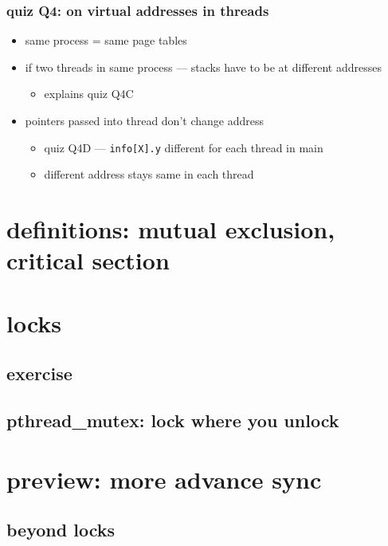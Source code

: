 \begin{frame}
\frametitle{quiz Q4: on virtual addresses in threads}
\begin{itemize}
\item same process = same page tables
\item if two threads in same process --- stacks have to be at different addresses
    \begin{itemize}
    \item explains quiz Q4C
    \end{itemize}
\item pointers passed into thread don't change address
    \begin{itemize}
    \item quiz Q4D --- \texttt{info[X].y} different for each thread in main
    \item different address stays same in each thread
    \end{itemize}
\end{itemize}
\end{frame}

\section{definitions: mutual exclusion, critical section}


\section{locks}




\subsection{exercise}


\subsection{pthread\_mutex: lock where you unlock}


\section{preview: more advance sync}


\subsection{beyond locks}


